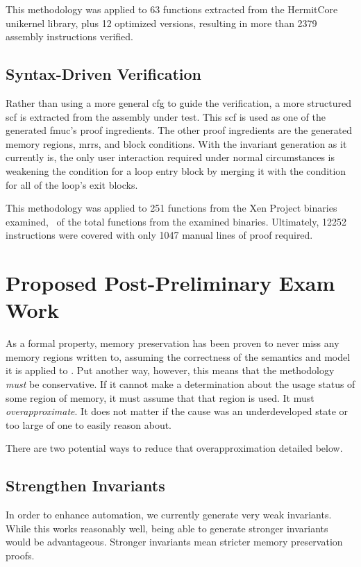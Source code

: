 This methodology was applied to \num{63} functions
extracted from the HermitCore unikernel library, plus \num{12} optimized versions,
resulting in more than \num{2379} assembly instructions verified.

\subsection{Syntax-Driven Verification}
Rather than using a more general \ac{cfg} to guide the verification,
a more structured \ac{scf} is extracted from the assembly under test.
This \ac{scf} is used as one of the generated \ac{fmuc}'s proof ingredients.
The other proof ingredients are the generated memory regions,
\acp{mrr}, and block conditions.
With the invariant generation as it currently is,
the only user interaction required under normal circumstances
is weakening the condition for a loop entry block
by merging it with the condition for all of the loop's exit blocks.

This methodology was applied to 251 functions from the Xen Project binaries examined,
\xenpercentage\ of the total functions from the examined binaries.
Ultimately, \num{12252} instructions were covered
with only \num{1047} manual lines of proof required.

\section{Proposed Post-Preliminary Exam Work}
As a formal property, memory preservation
has been proven to never miss any memory regions written to,
assuming the correctness of the semantics and model it is applied
to \autocite{bockenek2019preservation,popl2019underreview}.
Put another way, however, this means that the methodology \emph{must} be conservative.
If it cannot make a determination about the usage status of some region of memory,
it must assume that that region is used. It must \emph{overapproximate}.%
It does not matter if the cause was an underdeveloped state
or too large of one to easily reason about.

There are two potential ways to reduce that overapproximation detailed below.

\subsection{Strengthen Invariants}
In order to enhance automation, we currently generate very weak invariants.
While this works reasonably well, being able to generate stronger invariants
would be advantageous. Stronger invariants mean stricter memory preservation proofs.

